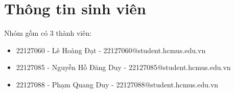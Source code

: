 \section{Thông tin sinh viên}
Nhóm gồm có 3 thành viên:
\begin{itemize}
    \item 22127060 - Lê Hoàng Đạt - 22127060@student.hcmus.edu.vn

    \item 22127085 - Nguyễn Hồ Đăng Duy - 22127085@student.hcmus.edu.vn

    \item 22127088 - Phạm Quang Duy - 22127088@student.hcmus.edu.vn
\end{itemize}